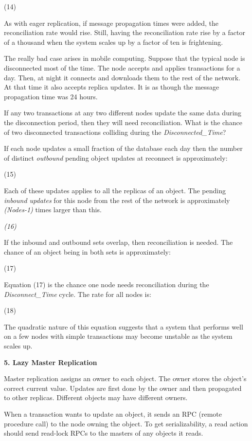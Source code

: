 \documentclass[a4paper,11pt,twoside,openright]{article}
\begin{document}
(14)

As with eager replication, if message propagation times were added, the
reconciliation rate would rise. Still, having the reconciliation rate
rise by a factor of a thousand when the system scales up by a factor of
ten is frightening.

The really bad case arises in mobile computing. Suppose that the typical
node is disconnected most of the time. The node accepts and applies
transactions for a day. Then, at night it connects and downloads them to
the rest of the network. At that time it also accepts replica updates.
It is as though the message propagation time was 24 hours.

If any two transactions at any two different nodes update the same data
during the disconnection period, then they will need reconciliation.
What is the chance of two disconnected transactions colliding during the
\emph{Disconnected\_Time}?

If each node updates a small fraction of the database each day then the
number of distinct \emph{outbound} pending object updates at reconnect
is approximately:

(15)

Each of these updates applies to all the replicas of an object. The
pending \emph{inbound updates} for this node from the rest of the
network is approximately \emph{(Nodes-1)} times larger than this.

\emph{(16)}

If the inbound and outbound sets overlap, then reconciliation is needed.
The chance of an object being in both sets is approximately:

(17)

Equation (17) is the chance one node needs reconciliation during the
\emph{Disconnect\_Time} cycle. The rate for all nodes is:

(18)

The quadratic nature of this equation suggests that a system that
performs well on a few nodes with simple transactions may become
unstable as the system scales up.

\textbf{5. Lazy Master Replication}

Master replication assigns an owner to each object. The owner stores the
object's correct current value. Updates are first done by the owner and
then propagated to other replicas. Different objects may have different
owners.

When a transaction wants to update an object, it sends an RPC (remote
procedure call) to the node owning the object. To get serializability, a
read action should send read-lock RPCs to the masters of any objects it
reads.
\end{document}

